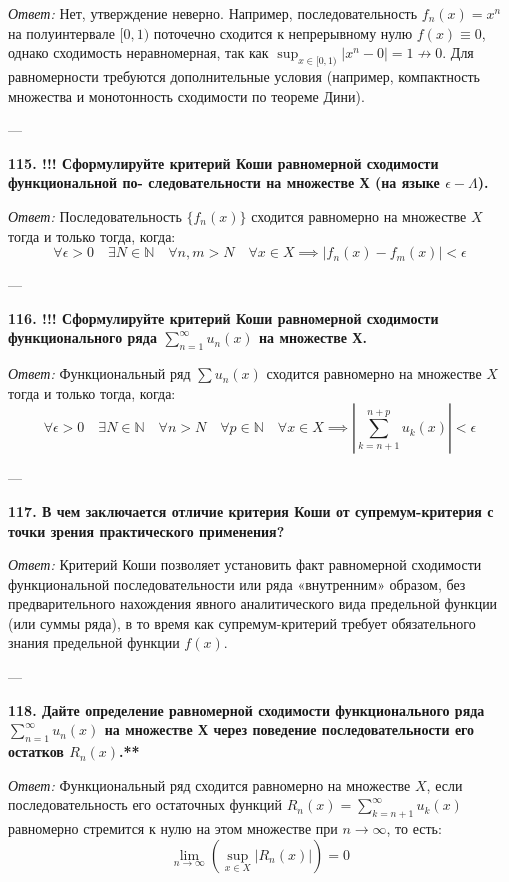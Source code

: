 \documentclass{article}
\begin{document}
\textit{Ответ:} Нет, утверждение неверно. Например, последовательность $f_n(x) = x^n$ на полуинтервале $[0, 1)$ поточечно сходится к непрерывному нулю $f(x) \equiv 0$, однако сходимость неравномерная, так как $\sup_{x \in [0, 1)} |x^n - 0| = 1 \not\to 0$. Для равномерности требуются дополнительные условия (например, компактность множества и монотонность сходимости по теореме Дини).

---

\textbf{115. !!! Сформулируйте критерий Коши равномерной сходимости функциональной по- следовательности на множестве Х (на языке $\epsilon-\Lambda$).}

\textit{Ответ:} Последовательность $\{f_n(x)\}$ сходится равномерно на множестве $X$ тогда и только тогда, когда:
$$ \forall \epsilon > 0 \quad \exists N \in \mathbb{N} \quad \forall n, m > N \quad \forall x \in X \implies |f_n(x) - f_m(x)| < \epsilon $$

---

\textbf{116. !!! Сформулируйте критерий Коши равномерной сходимости функционального ряда $\sum_{n=1}^{\infty}u_{n}(x)$ на множестве Х.}

\textit{Ответ:} Функциональный ряд $\sum u_n(x)$ сходится равномерно на множестве $X$ тогда и только тогда, когда:
$$ \forall \epsilon > 0 \quad \exists N \in \mathbb{N} \quad \forall n > N \quad \forall p \in \mathbb{N} \quad \forall x \in X \implies \left| \sum_{k=n+1}^{n+p} u_k(x) \right| < \epsilon $$

---

\textbf{117. В чем заключается отличие критерия Коши от супремум-критерия с точки зрения практического применения?}

\textit{Ответ:} Критерий Коши позволяет установить факт равномерной сходимости функциональной последовательности или ряда «внутренним» образом, без предварительного нахождения явного аналитического вида предельной функции (или суммы ряда), в то время как супремум-критерий требует обязательного знания предельной функции $f(x)$.

---

\textbf{118. Дайте определение равномерной сходимости функционального ряда $\sum_{n=1}^{\infty}u_{n}(x)$ на множестве Х через поведение последовательности его остатков $R_{n}(x)$.**}

\textit{Ответ:} Функциональный ряд сходится равномерно на множестве $X$, если последовательность его остаточных функций $R_n(x) = \sum_{k=n+1}^{\infty} u_k(x)$ равномерно стремится к нулю на этом множестве при $n \to \infty$, то есть:
$$ \lim_{n \to \infty} \left( \sup_{x \in X} |R_n(x)| \right) = 0 $$
\end{document}
